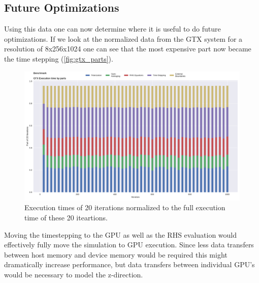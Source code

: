 \documentclass[master.tex]{subfiles}
\begin{document}
\subsection{Future Optimizations}
Using this data one can now determine where it is useful to do future optimizations. If we look at the normalized data from the \ac{GTX} system for a resolution of 8x256x1024 one can see that the most expensive part now became the time stepping (\autoref{fig:gtx_parts}).
\begin{figure}[!hbtp]
    \centering
    \includegraphics[width=\linewidth]{pdfs/gtx_parts.pdf}
    \caption{\small Execution times of 20 iterations normalized to the full execution time of these 20 iteartions.}
    \label{fig:gtx_parts}
\end{figure}
Moving the timestepping to the GPU as well as the \ac{RHS} evaluation would effectively fully move the simulation to GPU execution. Since less data transfers between host memory and device memory would be required this might dramatically increase performance, but data transfers between individual GPU's would be necessary to model the z-direction. 
\end{document}
